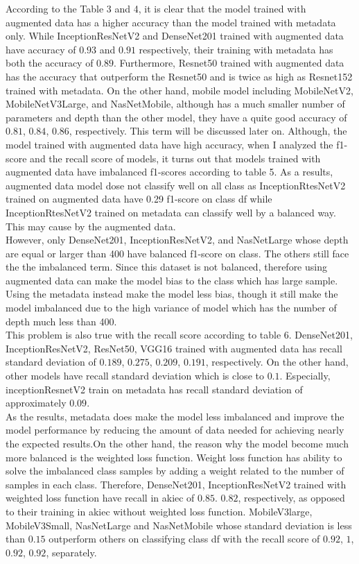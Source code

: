 According to the Table 3 and 4, it is clear that the model trained with augmented data has a higher accuracy than the model trained with metadata only.  While InceptionResNetV2 and DenseNet201 trained with augmented data have accuracy of $0.93$ and $0.91$ respectively, their training with metadata has both the accuracy of $0.89$. Furthermore, Resnet50 trained with augmented data has the accuracy that outperform the Resnet50 and is twice as high as Resnet152 trained with metadata. On the other hand, mobile model including MobileNetV2, MobileNetV3Large, and NasNetMobile, although has a much smaller number of parameters and depth than the other model, they have a quite good accuracy of $0.81$, $0.84$, $0.86$, respectively. This term will be discussed later on. Although, the model trained with augmented data have high accuracy, when I analyzed the f1-score and the recall score of models, it turns out that models trained with augmented data have imbalanced f1-scores according to table 5. As a results, augmented data model dose not classify well on all class as InceptionRtesNetV2 trained on augmented data have 0.29 f1-score on class df while InceptionRtesNetV2 trained on metadata can classify well by a balanced way. This may cause by the augmented data. \\
However, only DenseNet201, InceptionResNetV2, and NasNetLarge whose depth are equal or larger than 400 have balanced f1-score on class. The others still face the
the imbalanced term. Since this dataset is not balanced, therefore using augmented data can make the model bias to the class which has large sample. Using the metadata instead make the model less bias, though it still make the model imbalanced due to the high variance of model which has the number of depth much less than 400.\\ 
This problem is also true with the recall score according to table 6. DenseNet201, InceptionResNetV2, ResNet50, VGG16 trained with augmented data has recall standard deviation of $0.189$, $0.275$, $0.209$, $0.191$, respectively. On the other hand, other models have recall standard deviation which is close to $0.1$. Especially, inceptionResnetV2 train on metadata has recall standard deviation of approximately $0.09$. \\
As the results, metadata does make the model less imbalanced and improve the model performance by reducing the amount of data needed for achieving nearly the expected results.On the other hand, the reason why the model become much more balanced is the weighted loss function. Weight loss function has ability to solve the imbalanced class samples by adding a weight related to the number of samples in each class. Therefore, DenseNet201, InceptionResNetV2 trained with weighted loss function have recall in akiec of $0.85$. $0.82$, respectively, as opposed to their training in akiec without weighted loss function. MobileV3large, MobileV3Small, NasNetLarge and NasNetMobile whose standard deviation is less than $0.15$ outperform others on classifying class df with the recall score of $0.92$, $1$, $0.92$, $0.92$, separately.\\ 
